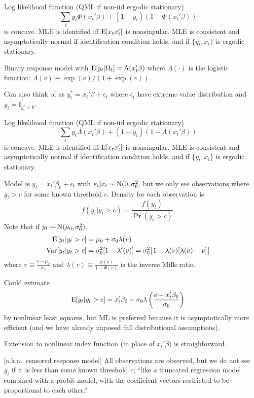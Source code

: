\documentclass[8pt,letterpaper, landscape]{extarticle} %
\begin{document}
\begin{multicols}{3}
\begin{description}
Log likelihood function (QML if non-iid ergodic stationary)
\[ \sum_t y_t \Phi (x_{t}' \beta) + (1-y_t) (1 - \Phi (x_{t}' \beta)) \]
is concave. MLE is identified iff $ \operatorname{E} [x_{t} x_{t}'] $ is nonsingular. MLE is consistent and asymptotically normal if identification condition holds, and if $ \{ y_t , x_t \} $ is ergodic stationary.

 Binary response model with $ \operatorname{E} [y_t | \Omega_t] = \Lambda (x_{t}' \beta) $ where $ \Lambda (\cdot) $ is the logistic function: $ \Lambda (v) \equiv \exp (v) / (1 + \exp (v)) $.

Can also think of as $ y_{t}^* = x_{t}' \beta + \epsilon_t $ where $ \epsilon_t $ have extreme value distribution and $ y_t = \mathbb{I}_{y_{t}^* > 0} $.

Log likelihood function (QML if non-iid ergodic stationary)
\[ \sum_t y_t \Lambda (x_{t}' \beta) + (1-y_t) (1 - \Lambda (x_{t}' \beta)) \]
is concave. MLE is identified iff $ \operatorname{E} [x_{t} x_{t}'] $ is nonsingular. MLE is consistent and asymptotically normal if identification condition holds, and if $ \{ y_t , x_t \} $ is ergodic stationary.

 Model is $ y_t = x_{t}' \beta_0 + \epsilon_t $ with $ \varepsilon_t | x_t \sim \operatorname{N} (0, \sigma_{0}^2 $, but we only see observations where $ y_t > c $ for some known threshold $ c $. Density for each observation is
\[ f (y_t | y_t > c) = \frac{f(y_t)}{\Pr (y_t > c)} . \]
Note that if $ y_t \sim \operatorname{N} (\mu_0, \sigma_{0}^2 ) $,
\begin{align*}
\operatorname{E} [y_t | y_t > c] &= \mu_0 + \sigma_0 \lambda (v) \\
\operatorname{Var} [y_t | y_t > c] &= \sigma_{0}^2 [1 - \lambda' (v)] = \sigma_{0}^2 \bigl [ 1 - \lambda (v) [\lambda (v) - v] \bigr ]
\end{align*}
where $ v \equiv \frac{c - \mu_0}{\sigma_0} $ and $ \lambda (v) \equiv \frac{\phi (v)}{1 - \Phi (v)} $ is the inverse Mills ratio.

Could estimate
$$ \operatorname{E} [y_t | y_t > c] = x_{t}' \beta_0 + \sigma_0 \lambda \left( \frac{c - x_{t}' \beta_0}{\sigma_0} \right) $$
by nonlinear least squares, but ML is preferred because it is asymptotically more efficient (and we have already imposed full distributional assumptions).

Extension to nonlinear index function (in place of $ x_{t}' \beta $) is straighforward.

 [a.k.a.\ censored response model] All observations are observed, but we do not see $ y_t $ if it is less than some known threshold $ c $; ``like a truncated regression model combined with a probit model, with the coefficient vectors restricted to be proportional to each other.''


\end{description}
\end{multicols}
\end{document}
